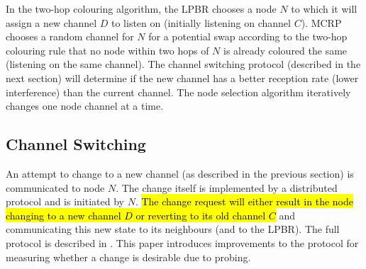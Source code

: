 In the two-hop colouring algorithm, the LPBR chooses a node $N$ to which it will assign a new channel $D$ to listen on (initially listening on channel $C$).  MCRP chooses a random channel for $N$ for a potential swap according to the two-hop colouring rule that no node within two hops of $N$ is already coloured the same (listening on the same channel).  The channel switching protocol (described in the next section) will determine if the new channel has a better reception rate (lower interference) than the current channel.  The node selection algorithm iteratively changes one node channel at a time. 


\subsection{Channel Switching}
\label{sec:switching}

An attempt to change to a new channel (as described in the previous section) is communicated to node $N$.  The change itself is implemented by a distributed protocol and is initiated  by $N$. \hl{The change request will either result in the node changing to a new channel $D$ or reverting to its old channel $C$} and communicating this new state to its neighbours (and to the LPBR).  The full protocol is described in \cite{mcrp}.  This paper introduces improvements to the protocol for measuring whether a change is desirable due to probing.



